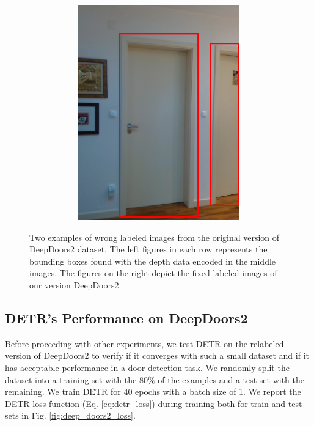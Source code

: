 \begin{figure}[h!]
\begin{subfigure}[b]{\linewidth}
\begin{subfigure}[b]{0.32\linewidth}
			\includegraphics[width=\linewidth]{images/deep_doors_2_labeling2_correct.png}
		\end{subfigure}
	\hfil
		\caption{}
	\end{subfigure}
	\caption{Two examples of wrong labeled images from the original version of DeepDoors2 dataset. The left figures in each row represents the bounding boxes found with the depth data encoded in the middle images. The figures on the right depict the fixed labeled images of our version DeepDoors2.}
	\label{fig:relabeling_deepdoors2}
\end{figure}

\subsection{DETR's Performance on DeepDoors2}

Before proceeding with other experiments, we test DETR on the relabeled version of DeepDoors2 to verify if it converges with such a small dataset and if it has acceptable performance in a door detection task. We randomly split the dataset into a training set with the $80\%$ of the examples and a test set with the remaining. We train DETR for 40 epochs with a batch size of 1. We report the DETR loss function (Eq. \ref{eq:detr_loss}) during training both for train and test sets in Fig. \ref{fig:deep_doors2_loss}.

